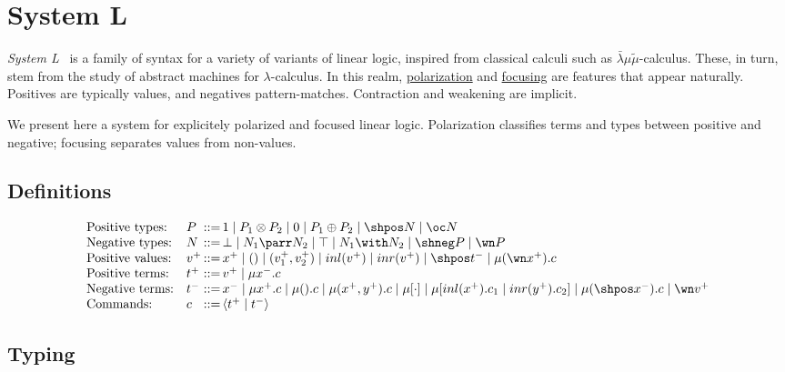 \chapter{System L}\label{system-l}

\emph{System L}~\cite{dualitycomputationfocus} is a family of syntax for a variety of variants of
linear logic, inspired from classical calculi such as
\(\bar\lambda\mu\tilde\mu\)-calculus. These, in turn, stem from the
study of abstract machines for \(\lambda\)-calculus. In this realm,
\hyperref[polarized-linear-logic]{polarization} and \hyperref[reversibility-and-focusing]{focusing} are
features that appear naturally. Positives are typically values, and
negatives pattern-matches. Contraction and weakening are implicit.

We present here a system for explicitely polarized and focused linear
logic. Polarization classifies terms and types between positive and
negative; focusing separates values from non-values.

\section{Definitions}\label{definitions}

\begin{equation*}
\begin{array}{ll@{\,}l@{\,}l}
\text{Positive types:} & P & ::= & 1 \mid P_1 \otimes P_2 \mid 0 \mid P_1 \oplus P_2 \mid \shpos N \mid \oc N \\
\text{Negative types:} & N & ::= & \bot \mid N_1 \parr N_2 \mid \top \mid N_1 \with N_2 \mid \shneg P \mid \wn P \\
\text{Positive values:} & v^+ & ::= & x^+ \mid () \mid (v_1^+, v_2^+) \mid inl(v^+) \mid inr(v^+) \mid \shpos t^- \mid \mu(\wn x^+).c \\
\text{Positive terms:} & t^+ & ::= & v^+ \mid \mu x^-.c \\
\text{Negative terms:} & t^- & ::= & x^- \mid \mu x^+.c \mid \mu().c \mid \mu(x^+, y^+).c \mid \mu [\cdot] \mid \mu[inl(x^+).c_1 \mid inr(y^+).c_2] \mid \mu(\shpos x^-).c \mid \wn v^+ \\
\text{Commands:} & c & ::= & \langle t^+ \mid t^- \rangle
\end{array}
\end{equation*}

\section{Typing}

